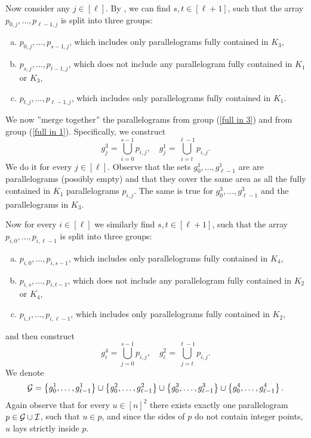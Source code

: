 \documentclass[11pt]{article}
\newcommand{\set}[1]{\left\lbrace #1 \right\rbrace}
\theoremstyle{plain}
\theoremstyle{definition}
\theoremstyle{remark}
\begin{document}
Now consider any $j \in [\ell]$.
By , we can find $s, t \in [\ell + 1]$, such that the array $p_{0, j}, \dots, p_{\ell - 1, j}$ is split into three groups:
\begin{enumerate}[a)]
	\item $p_{0, j}, \dots, p_{s - 1, j}$, which includes only parallelograms fully contained in $K_3$, \label{full in 3}
	\item $p_{s, j}, \dots, p_{t - 1, j}$, which does not include any parallelogram fully contained in $K_1$ or $K_3$,
	\item $p_{t, j}, \dots, p_{\ell - 1, j}$, which includes only parallelograms fully contained in $K_1$. \label{full in 1}
\end{enumerate}
We now ''merge together'' the parallelograms from group (\ref{full in 3}) and from group (\ref{full in 1}).
Specifically, we construct
$$
g^3_j = \bigcup_{i = 0}^{s - 1} p_{i, j}, \quad 
g^1_j = \bigcup_{i = t}^{\ell - 1} p_{i, j}.
$$
We do it for every $j \in [\ell]$.
Observe that the sets $g^1_0, \dots, g^1_{\ell - 1}$ are are parallelograms (possibly empty) and that they cover the same area as all the fully contained in $K_1$ parallelograms $p_{i, j}$.
The same is true for $g^3_0, \dots, g^3_{\ell - 1}$ and the parallelograms in $K_3$. 

Now for every $i \in [\ell]$ we similarly find $s, t \in [\ell + 1]$, such that the array $p_{i, 0}, \dots, p_{i, \ell - 1}$ is split into three groups:
\begin{enumerate}[a)]
	\item $p_{i, 0}, \dots, p_{i, s - 1}$, which includes only parallelograms fully contained in $K_4$,
	\item $p_{i, s}, \dots, p_{i, t - 1}$, which does not include any parallelogram fully contained in $K_2$ or $K_4$,
	\item $p_{i, t}, \dots, p_{i, \ell - 1}$, which includes only parallelograms fully contained in $K_2$,
\end{enumerate}
and then construct
$$
g^4_i = \bigcup_{j = 0}^{s - 1} p_{i, j}, \quad 
g^2_i = \bigcup_{j = t}^{\ell - 1} p_{i, j}.
$$
We denote
$$
\G = \set{g^1_0, \dots, g^1_{\ell - 1}}  
\cup \set{g^2_0, \dots, g^2_{\ell - 1}}
\cup \set{g^3_0, \dots, g^3_{\ell - 1}}
\cup \set{g^4_0, \dots, g^4_{\ell - 1}}.
$$
Again observe that for every $u \in [n]^2$ there exists exactly one parallelogram $p \in \mathcal{G} \cup \mathcal{I}$, such that $u \in p$, and since the sides of $p$ do not contain integer points, $u$ lays strictly inside $p$.
\end{document}
